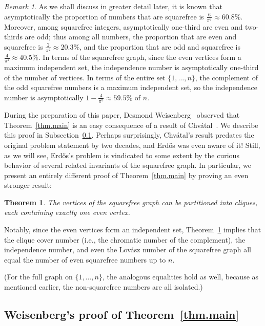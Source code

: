 \documentclass{article}
\theoremstyle{plain}
\newtheorem{theorem}{Theorem}
\theoremstyle{definition}
\theoremstyle{remark}
\newtheorem*{remark}{Remark}
\newcommand{\Erdos}{Erd\H{o}s}
\newcommand{\Lovasz}{Lov\'asz}
\newcommand{\Chvatal}{Chv\'atal}
\begin{document}
\begin{remark}
As we shall discuss in greater detail later, it is known that asymptotically the proportion of numbers that are squarefree is $\frac{6}{\pi^2} \approx 60.8\%$.
Moreover, among squarefree integers, asymptotically one-third are even and two-thirds are odd; thus among all numbers, the proportion that are even and squarefree is $\frac{2}{\pi^2} \approx 20.3\%$, and the proportion that are odd and squarefree is $\frac{4}{\pi^2} \approx 40.5\%$.
In terms of the squarefree graph, since the even vertices form a maximum independent set, the independence number is asymptotically one-third of the number of vertices.
In terms of the entire set $\{1,\ldots,n\}$, the complement of the odd squarefree numbers is a maximum independent set, so the independence number is asymptotically $1-\frac{4}{\pi^2}\approx 59.5\%$ of $n$.
\end{remark}

During the preparation of this paper, Desmond Weisenberg~\cite{dotcom} observed that Theorem~\ref{thm.main} is an easy consequence of a result of \Chvatal{}~\cite{chvatal}.
We describe this proof in Subsection~\ref{subsec.weisenberg}.
Perhaps surprisingly, \Chvatal{}'s result predates the original problem statement by two decades, and \Erdos{} was even aware of it!
Still, as we will see, \Erdos{}’s problem is vindicated to some extent by the curious behavior of several related invariants of the squarefree graph.
In particular, we present an entirely different proof of Theorem~\ref{thm.main} by proving an even stronger result:

\begin{theorem}
\label{thm.stronger}
The vertices of the squarefree graph can be partitioned into cliques, each containing exactly one even vertex.
\end{theorem}

Notably, since the even vertices form an independent set, Theorem~\ref{thm.stronger} implies that the clique cover number (i.e., the chromatic number of the complement), the independence number, and even the \Lovasz{} number of the squarefree graph all equal the number of even squarefree numbers up to $n$.

(For the full graph on $\{1,\dotsc,n\}$, the analogous equalities hold as well, because as mentioned earlier, the non-squarefree numbers are all isolated.)

\subsection{Weisenberg's proof of Theorem~\ref{thm.main}}
\label{subsec.weisenberg}
\end{document}
